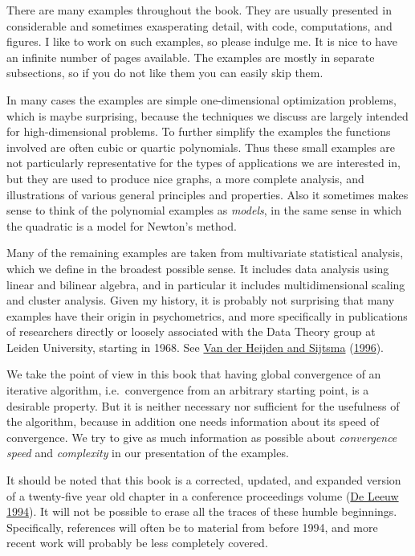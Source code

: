 \documentclass[
  12pt,
]{book}
\begin{document}
There are many examples throughout the book. They are usually presented in considerable and sometimes exasperating detail, with code, computations, and figures. I like to work on such examples, so please indulge me. It is nice to have an infinite number of pages available. The examples are mostly in separate subsections, so if you do not like them you can easily skip them.

In many cases the examples are simple one-dimensional optimization problems, which is maybe surprising, because the techniques
we discuss are largely intended for high-dimensional problems. To further simplify the examples the functions involved are often cubic or quartic polynomials. Thus these small examples are not particularly representative for the types of applications we are interested in, but they are used to produce nice graphs, a more complete analysis, and illustrations of various general principles and properties. Also it sometimes makes sense to think of the polynomial examples as \emph{models}, in the same sense in which the quadratic is a model for Newton's method.

Many of the remaining examples are taken from multivariate statistical analysis, which we define in the broadest possible sense. It includes data analysis using linear and bilinear algebra, and in particular it includes multidimensional scaling and cluster analysis. Given my history, it is probably not surprising that many examples have their origin in psychometrics, and more specifically in publications of researchers directly or loosely associated with the Data Theory group at Leiden University, starting in 1968. See \protect\hyperlink{ref-vanderheijden_sijtsma_96}{Van der Heijden and Sijtsma} (\protect\hyperlink{ref-vanderheijden_sijtsma_96}{1996}).

We take the point of view in this book that having global convergence of an iterative algorithm, i.e.~convergence from an arbitrary starting point, is a desirable property. But it is neither necessary nor sufficient for the usefulness of the algorithm, because in addition one needs information about its speed of convergence. We try to give as much information as possible about \emph{convergence speed} and \emph{complexity} in our presentation of the examples.

It should be noted that this book is a corrected, updated, and expanded version of a twenty-five year old chapter in a conference proceedings volume (\protect\hyperlink{ref-deleeuw_C_94c}{De Leeuw 1994}). It will not be possible to erase all the traces of these humble beginnings. Specifically, references will often be to material from before 1994, and more recent work will probably be less completely covered.
\end{document}

